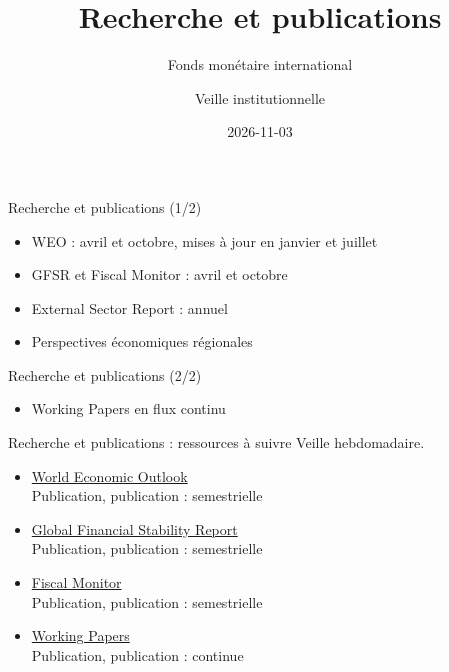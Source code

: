 \documentclass[aspectratio=169,11pt]{beamer}
\title{Recherche et publications}
\subtitle{Fonds monétaire international}
\author{Veille institutionnelle}
\date{2026-11-03}
\begin{document}
\begin{frame}\titlepage\end{frame}

\begin{frame}{Recherche et publications (1/2)}
\begin{itemize}
\item WEO : avril et octobre, mises à jour en janvier et juillet
\item GFSR et Fiscal Monitor : avril et octobre
\item External Sector Report : annuel
\item Perspectives économiques régionales
\end{itemize}
\end{frame}

\begin{frame}{Recherche et publications (2/2)}
\begin{itemize}
\item Working Papers en flux continu
\end{itemize}
\end{frame}

\begin{frame}{Recherche et publications : ressources à suivre}
\small
Veille hebdomadaire.
\begin{itemize}
\item \href{https://www.imf.org/en/Publications/WEO}{World Economic Outlook}\\{\footnotesize Publication, publication : semestrielle}
\item \href{https://www.imf.org/en/Publications/GFSR}{Global Financial Stability Report}\\{\footnotesize Publication, publication : semestrielle}
\item \href{https://www.imf.org/en/Publications/FM}{Fiscal Monitor}\\{\footnotesize Publication, publication : semestrielle}
\item \href{https://www.imf.org/en/Publications/WP}{Working Papers}\\{\footnotesize Publication, publication : continue}
\end{itemize}
\end{frame}
\end{document}

